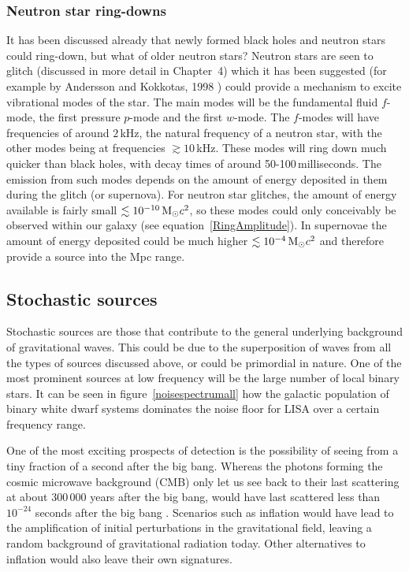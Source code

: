 \subsubsection{Neutron star ring-downs}
It has been discussed already that newly formed black holes and neutron stars could ring-down, but
what of older neutron stars? Neutron stars are seen to glitch (discussed in more detail in
Chapter~4) which it has been suggested (for example by Andersson and Kokkotas, 1998
\cite{AnderssonKokkotas:1998}) could provide a mechanism to excite vibrational modes of the star.
The main modes will be the fundamental fluid $f$-mode, the first pressure $p$-mode and the first \gw
$w$-mode. The $f$-modes will have frequencies of around $2$\,kHz, the natural frequency of a neutron
star, with the other modes being at frequencies $\gtrsim 10$\,kHz. These modes will ring down much
quicker than black holes, with decay times of around 50-100\,milliseconds. The \gw emission from
such modes depends on the amount of energy deposited in them during the glitch (or supernova). For
neutron star glitches, the amount of energy available is fairly small $\lesssim 10^{-10}\,{\rm
M}_{\odot}c^2$, so these modes could only conceivably be observed within our galaxy (see
equation~\ref{RingAmplitude}). In supernovae the amount of energy deposited could be much higher
$\lesssim 10^{-4}\,{\rm M}_{\odot}c^2$ and therefore provide a source into the Mpc range.

\subsection{Stochastic sources}
Stochastic sources are those that contribute to the general underlying background of gravitational
waves. This could be due to the superposition of waves from all the types of sources discussed
above, or could be primordial in nature. One of the most prominent sources at low frequency will be
the large number of local binary stars. It can be seen in figure~\ref{noisespectrumall} how the
galactic population of binary white dwarf systems dominates the noise floor for LISA over a certain
frequency range.

One of the most exciting prospects of \gw detection is the possibility of seeing \gws from a tiny
fraction of a second after the big bang. Whereas the photons forming the cosmic microwave background
(CMB) only let us see back to their last scattering at about 300\,000 years after the big bang,
\gws would have last scattered less than $10^{-24}$ seconds after the big bang \cite{Schutz:1999}.
Scenarios such as inflation would have lead to the amplification of initial perturbations in the
gravitational field, leaving a random background of gravitational radiation today. Other
alternatives to inflation would also leave their own \gw signatures.

